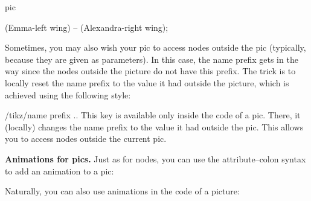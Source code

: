 \begin{pathoperation}{pic}
\begin{codeexample}
{  \draw (Emma-left wing) -- (Alexandra-right wing);
}
\end{codeexample}

    Sometimes, you may also wish your pic to access nodes outside the pic
    (typically, because they are given as parameters). In this case, the name
    prefix gets in the way since the nodes outside the picture do not have this
    prefix. The trick is to locally reset the name prefix to the value it had
    outside the picture, which is achieved using the following style:

    \begin{key}{/tikz/name prefix ..}
        This key is available only inside the code of a pic. There, it
        (locally) changes the name prefix to the value it had outside the pic.
        This allows you to access nodes outside the current pic.
    \end{key}

    \medskip
    \textbf{Animations for pics.}
    Just as for nodes, you can use the attribute--colon syntax to add an
    animation to a pic:
\begin{codeexample}[
    preamble={\usetikzlibrary{animations}},
    animation list={0.5,1,1.5,2},
    pre={\tikzset{
  seagull/.pic={
    \coordinate (-left wing) at (-3mm,0);
    \coordinate (-head)      at (0,0);
    \coordinate (-right wing) at (3mm,0);
    \draw (-left wing) to [bend left] (0,0) (-head) to [bend left] (-right wing);
  }
}},
]
\end{codeexample}
    Naturally, you can also use animations in the code of a picture:
\begin{codeexample}[
    preamble={\usetikzlibrary{animations}},
    animation list={0.5,1,1.5,2},
    width=3cm,
]
\end{codeexample}
\end{pathoperation}


